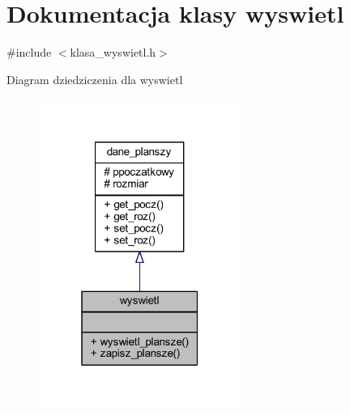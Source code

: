 \hypertarget{classwyswietl}{}\section{Dokumentacja klasy wyswietl}
\label{classwyswietl}


{\ttfamily \#include $<$klasa\+\_\+wyswietl.\+h$>$}



Diagram dziedziczenia dla wyswietl
\nopagebreak
\begin{figure}[H]
\begin{center}
\leavevmode
\includegraphics[width=187pt]{classwyswietl__inherit__graph}
\end{center}
\end{figure}


